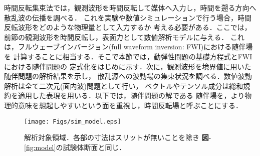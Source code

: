 ﻿時間反転集束法では，観測波形を時間反転して媒体へ入力し，時間を遡る方向へ散乱波の伝播を調べる．
これを実験や数値シミュレーションで行う場合，時間反転波形をどのような物理量として入力するか
考える必要がある．ここでは，前節の観測波形を時間反転し，表面力として数値解析モデルに与える．
これは，フルウェーブインバージョン(full waveform inversion: FWI)における随伴場を
計算することに相当する．そこで本節では，動弾性問題の基礎方程式とFWIにおける随伴問題の
定式化をはじめに示す．次に，観測波形を境界値に用いた随伴問題の解析結果を示し，
散乱源への波動場の集束状況を調べる．数値波動解析は全て二次元(面内波)問題として行い，
ベクトルやテンソル成分は総和規約を適用した表現を用いる．以下では，随伴問題の解である
随伴場を，より物理的意味を想起しやすいという面を重視し，時間反転場と呼ぶことにする．
\begin{figure}[tbh]
\centering
	\texttt{[image: Figs/sim\_model.eps]}
	\caption{解析対象領域．各部の寸法はスリットが無いことを除き
	{\bf 図}-\ref{fig:model}の試験体断面と同じ．}
	\label{fig:fd_model}
\end{figure}
